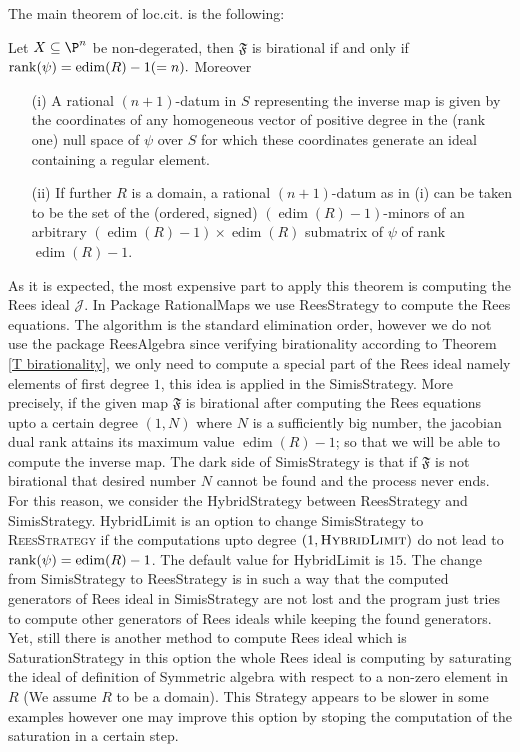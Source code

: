 \documentclass[12pt]{amsart}
\numberwithin{equation}{theorem}
\renewcommand{\:}{\colon}
\DeclareMathOperator{\edim}{edim}
\theoremstyle{theorem}
\begin{document}
The main theorem of loc.cit. is the following: 
\begin{theorem} \label{T birationality}Let $X\subseteq \P^n$ be non-degerated, then $\mathfrak{F}$ is birational if and only if ${\rm rank}(\psi)=\edim(R)-1(=n).$
Moreover
\begin{enumerate}
\item[{\rm (i)}] A rational $(n+1)$-datum in
$S$ representing the inverse map is given by the coordinates of any homogeneous vector of positive degree
in the {\rm (}rank one{\rm )} null space of $\psi$ over $S$ for which these coordinates generate an ideal containing
a regular element.

\item[{\rm (ii)}] If further $R$ is a domain, a rational $(n+1)$-datum as in {\rm (i)}
can be taken to be the set of the {\rm (}ordered, signed{\rm )} $(\edim(R)-1)$-minors
of an arbitrary $(\edim(R)-1)\times \edim(R)$ submatrix of $\psi$ of rank $\edim(R)-1$.
\end{enumerate}

\end{theorem}
As it is expected, the most expensive part to apply this theorem is computing the Rees ideal ${\mathcal J}$. In Package {\textsc RationalMaps} we use {\textsc ReesStrategy} to compute the Rees equations. The algorithm is the standard elimination order, however we do not use the package {\textsc ReesAlgebra} since verifying birationality according to Theorem \ref{T birationality}, we only need to compute a special part of the Rees ideal namely elements of first degree $1$, this idea is applied in the {\textsc SimisStrategy}. More precisely, if the given map $\mathfrak{F}$ is birational after computing the Rees equations upto a certain degree $(1,N)$ where $N$ is a sufficiently big number, the jacobian dual rank attains its maximum value $\edim(R)-1$; so that we will be able to compute the inverse map.  The dark side of {\textsc SimisStrategy} is that if $\mathfrak{F}$ is not birational that desired number $N$ cannot be found and the process never ends. For this reason,  we consider the {\textsc HybridStrategy}  between {\textsc ReesStrategy} and {\textsc SimisStrategy}. {\textsc HybridLimit} is an option to change  {\textsc SimisStrategy} to  \textsc{ReesStrategy} if the computations upto degree $(1, \textsc{HybridLimit})$ do not lead to   ${\rm rank}(\psi)=\edim(R)-1$. 
The default value for {\textsc HybridLimit} is $15$. The change from  {\textsc SimisStrategy} to  {\textsc ReesStrategy} is in such a way that the computed  generators of   Rees ideal  in { \textsc SimisStrategy} are not lost and the program just tries to compute other generators of Rees ideals while keeping the found generators.  Yet, still there is another method to compute Rees ideal which is {\textsc SaturationStrategy} in this option the whole Rees ideal is computing by saturating the  ideal of definition of Symmetric algebra with respect to a non-zero element in $R$ (We assume $R$ to be a domain). This Strategy appears to be slower in some examples however one may improve this option by stoping the computation of the saturation in a certain step.
\end{document}
